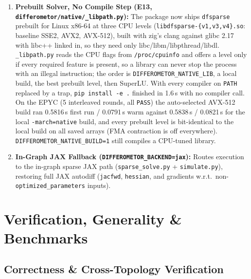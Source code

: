 \documentclass[11pt,a4paper]{article}
\begin{document}
\begin{enumerate}[leftmargin=1.6em,itemsep=3pt]
    \item \textbf{Prebuilt Solver, No Compile Step (E13, \texttt{differometor/native/\_libpath.py}):} The package now ships \texttt{dfsparse} prebuilt for Linux x86-64 at three CPU levels (\texttt{libdfsparse-\{v1,v3,v4\}.so}: baseline SSE2, AVX2, AVX-512), built with zig's clang against glibc 2.17 with libc++ linked in, so they need only libc/libm/libpthread/libdl. \texttt{\_libpath.py} reads the CPU flags from \texttt{/proc/cpuinfo} and offers a level only if every required feature is present, so a library can never stop the process with an illegal instruction; the order is \texttt{DIFFEROMETOR\_NATIVE\_LIB}, a local build, the best prebuilt level, then SuperLU. With every compiler on \texttt{PATH} replaced by a trap, \texttt{pip install -e .} finished in 1.6\,s with no compiler call. On the EPYC (5 interleaved rounds, all \texttt{PASS}) the auto-selected AVX-512 build ran 0.5816\,s first run / 0.0791\,s warm against 0.5838\,s / 0.0821\,s for the local \texttt{-march=native} build, and every prebuilt level is bit-identical to the local build on all saved arrays (FMA contraction is off everywhere). \texttt{DIFFEROMETOR\_NATIVE\_BUILD=1} still compiles a CPU-tuned library.
    \item \textbf{In-Graph JAX Fallback (\texttt{DIFFEROMETOR\_BACKEND=jax}):} Routes execution to the in-graph sparse JAX path (\texttt{sparse\_solve.py} + \texttt{simulate.py}), restoring full JAX autodiff (\texttt{jacfwd}, \texttt{hessian}, and gradients w.r.t.\ non-\texttt{optimized\_parameters} inputs).
\end{enumerate}

\section{Verification, Generality \& Benchmarks}

\subsection{Correctness \& Cross-Topology Verification}
\end{document}
